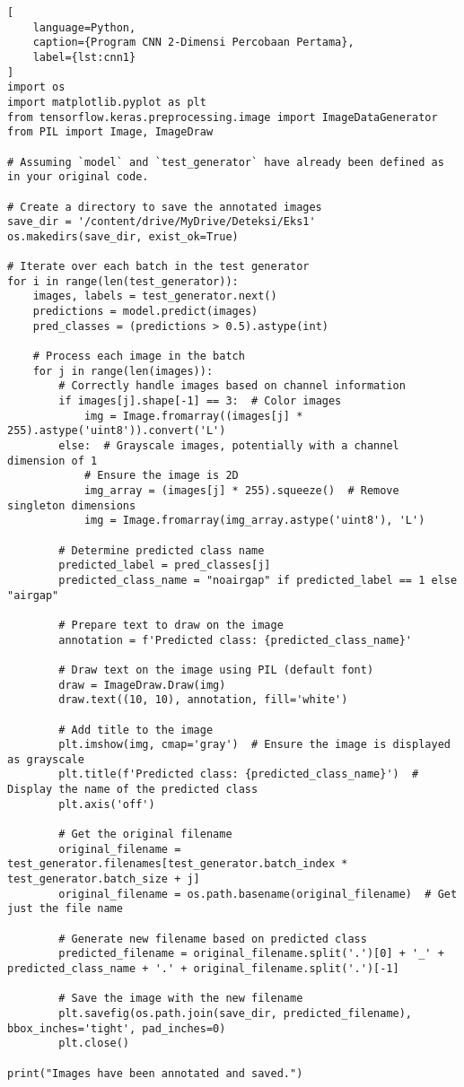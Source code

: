 \begin{lstlisting}[
    language=Python,
    caption={Program CNN 2-Dimensi Percobaan Pertama},
    label={lst:cnn1}
]
import os
import matplotlib.pyplot as plt
from tensorflow.keras.preprocessing.image import ImageDataGenerator
from PIL import Image, ImageDraw

# Assuming `model` and `test_generator` have already been defined as in your original code.

# Create a directory to save the annotated images
save_dir = '/content/drive/MyDrive/Deteksi/Eks1'
os.makedirs(save_dir, exist_ok=True)

# Iterate over each batch in the test generator
for i in range(len(test_generator)):
    images, labels = test_generator.next()
    predictions = model.predict(images)
    pred_classes = (predictions > 0.5).astype(int)

    # Process each image in the batch
    for j in range(len(images)):
        # Correctly handle images based on channel information
        if images[j].shape[-1] == 3:  # Color images
            img = Image.fromarray((images[j] * 255).astype('uint8')).convert('L')
        else:  # Grayscale images, potentially with a channel dimension of 1
            # Ensure the image is 2D
            img_array = (images[j] * 255).squeeze()  # Remove singleton dimensions
            img = Image.fromarray(img_array.astype('uint8'), 'L')

        # Determine predicted class name
        predicted_label = pred_classes[j]
        predicted_class_name = "noairgap" if predicted_label == 1 else "airgap"

        # Prepare text to draw on the image
        annotation = f'Predicted class: {predicted_class_name}'

        # Draw text on the image using PIL (default font)
        draw = ImageDraw.Draw(img)
        draw.text((10, 10), annotation, fill='white')

        # Add title to the image
        plt.imshow(img, cmap='gray')  # Ensure the image is displayed as grayscale
        plt.title(f'Predicted class: {predicted_class_name}')  # Display the name of the predicted class
        plt.axis('off')

        # Get the original filename
        original_filename = test_generator.filenames[test_generator.batch_index * test_generator.batch_size + j]
        original_filename = os.path.basename(original_filename)  # Get just the file name

        # Generate new filename based on predicted class
        predicted_filename = original_filename.split('.')[0] + '_' + predicted_class_name + '.' + original_filename.split('.')[-1]

        # Save the image with the new filename
        plt.savefig(os.path.join(save_dir, predicted_filename), bbox_inches='tight', pad_inches=0)
        plt.close()

print("Images have been annotated and saved.")
\end{lstlisting}

